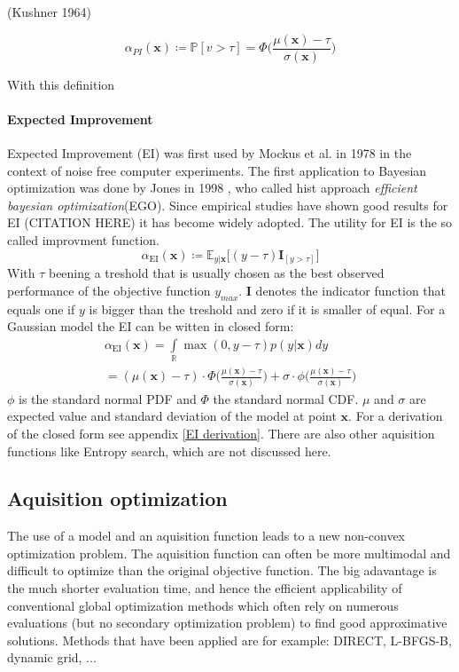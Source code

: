 \documentclass[english]{article}
\newcommand{\EI}{\operatorname{EI}}
\newcommand{\x}{\mathbf{x}}
\newcommand{\E}{\mathbb{E}}
\begin{document}
(Kushner 1964)

\begin{equation}
  \alpha_{PI}(\x) \coloneqq \mathbb{P}[v>\tau] = \Phi\bigg(\frac{\mu(\x)-\tau}{\sigma(\x)}\bigg)
\end{equation}

With this definition

\paragraph{Expected Improvement}
Expected Improvement (EI) was first used by Mockus et al. in 1978 \cite{mockus_application_1978} in the context of noise free computer experiments. The first application to Bayesian optimization was done by Jones in 1998 \cite{jones_efficient_1998}, who called hist approach \textit{efficient bayesian optimization}(EGO). Since empirical studies have shown good results for EI (CITATION HERE) it has become widely adopted. The utility for EI is the so called improvment function.
\begin{equation}
  \alpha_{\EI}(\x) \coloneqq \E_{y|\x}\big[(y - \tau)\mathbf{I}_{[y > \tau]}\big]
\end{equation}
With $\tau$ beening a treshold that is usually chosen as the best observed performance of the objective function $y_{max}$. $\mathbf{I}$ denotes the indicator function that equals one if $y$ is bigger than the treshold and zero if it is smaller of equal. For a Gaussian model the EI can be witten in closed form:
\begin{equation}
  \begin{split}
    \alpha_{\EI}(\x) = \int\limits_{\mathbb{R}} \max(0, y-\tau)p(y|\x)dy
    \\
    = (\mu(\x) - \tau) \cdot \Phi \bigg(\frac{\mu(\x)-\tau}{\sigma(\x)}\bigg) + \sigma \cdot \phi \bigg(\frac{\mu(\x)-\tau}{\sigma(\x)}\bigg)
  \end{split}
\end{equation}
$\phi$ is the standard normal PDF and $\Phi$ the standard normal CDF. $\mu$ and $\sigma$ are expected value and standard deviation of the model at point $\x$.
For a derivation of the closed form see appendix \ref{EI derivation}.
There are also other aquisition functions like Entropy search, which are not discussed here.

\subsection*{Aquisition optimization}
The use of a model and an aquisition function leads to a new non-convex optimization problem. The aquisition function can often be more multimodal and difficult to optimize than the original objective function. The big adavantage is the much shorter evaluation time, and hence the efficient applicability of conventional global optimization methods which often rely on numerous evaluations (but no secondary optimization problem) to find good approximative solutions.
Methods that have been applied are for example: DIRECT, L-BFGS-B, dynamic grid, ...
\end{document}
